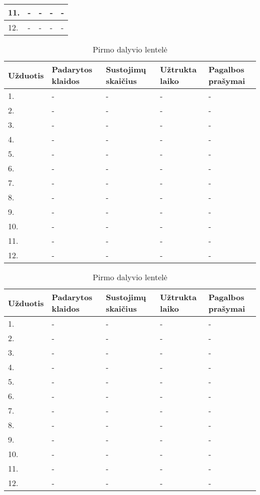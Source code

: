 \documentclass[oneside]{VUMIFPSkursinis}
\begin{document}
\begin{center}
\begin{table}[!pht]
\begin{tabular}{ |p{1.8cm} | p{3.4cm} | p{3.4cm} | p{2.5cm} | p{3.5cm}|}
11.&-&-&-&- \\ \hline
12.&-&-&-&- \\ \hline
\end{tabular}
\end{table}
\vspace{0.7cm}
	\begin{table}[!pht]
	\caption{Pirmo dalyvio lentelė}
	\begin{tabular}{ |p{1.8cm} | p{3.4cm} | p{3.4cm} | p{2.5cm} | p{3.5cm}|}
	\hline
	Užduotis&Padarytos klaidos&Sustojimų skaičius&Užtrukta laiko&Pagalbos prašymai\\ \hline
1.&-&-&-&- \\ \hline
2.&-&-&-&- \\ \hline
3.&-&-&-&- \\ \hline
4.&-&-&-&- \\ \hline
5.&-&-&-&- \\ \hline
6.&-&-&-&- \\ \hline
7.&-&-&-&- \\ \hline
8.&-&-&-&- \\ \hline
9.&-&-&-&- \\ \hline
10.&-&-&-&- \\ \hline
11.&-&-&-&- \\ \hline
12.&-&-&-&- \\ \hline
\end{tabular}
\end{table}
\vspace{0.7cm}
	\begin{table}[!pht]
	\caption{Pirmo dalyvio lentelė}
	\begin{tabular}{ |p{1.8cm} | p{3.4cm} | p{3.4cm} | p{2.5cm} | p{3.5cm}|}
	\hline
	Užduotis&Padarytos klaidos&Sustojimų skaičius&Užtrukta laiko&Pagalbos prašymai\\ \hline
1.&-&-&-&- \\ \hline
2.&-&-&-&- \\ \hline
3.&-&-&-&- \\ \hline
4.&-&-&-&- \\ \hline
5.&-&-&-&- \\ \hline
6.&-&-&-&- \\ \hline
7.&-&-&-&- \\ \hline
8.&-&-&-&- \\ \hline
9.&-&-&-&- \\ \hline
10.&-&-&-&- \\ \hline
11.&-&-&-&- \\ \hline
12.&-&-&-&- \\ \hline

\end{tabular}
\end{table}
\end{center}
\end{document}

